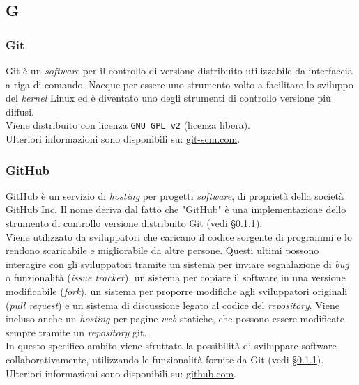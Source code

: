 \subsection{G}

\subsubsection{Git}
\label{git}
Git è un \textit{software} per il controllo di versione distribuito utilizzabile
da interfaccia a riga di comando.
Nacque per essere uno strumento volto a facilitare lo sviluppo del
\textit{kernel} Linux ed è diventato uno degli strumenti di controllo versione
più diffusi.\\
Viene distribuito con licenza \texttt{GNU GPL v2} (licenza libera). \\
Ulteriori informazioni sono disponibili su:
\href{https://git-scm.com/}{git-scm.com}.

\subsubsection{GitHub}
\label{github}
GitHub è un servizio di \textit{hosting} per progetti \textit{software}, di
proprietà della società GitHub Inc.
Il nome deriva dal fatto che "GitHub" è una implementazione dello strumento di
controllo versione distribuito Git (vedi \S\ref{git}). \\
Viene utilizzato da sviluppatori che caricano il codice sorgente di programmi e
lo rendono scaricabile e migliorabile da altre persone.
Questi ultimi possono interagire con gli sviluppatori tramite un sistema per
inviare segnalazione di \textit{bug} o funzionalità (\textit{issue tracker}), un sistema
per copiare il software in una versione modificabile (\textit{fork}), un sistema
per proporre modifiche agli sviluppatori originali (\textit{pull request}) e un
sistema di discussione legato al codice del \textit{repository}.
Viene incluso anche un \textit{hosting} per pagine \textit{web} statiche, che
possono essere modificate sempre tramite un \textit{repository} git.\\
In questo specifico ambito viene sfruttata la possibilità di sviluppare software
collaborativamente, utilizzando le funzionalità fornite da
Git (vedi \S\ref{git}). \\
Ulteriori informazioni sono disponibili su:
\href{https://github.com/}{github.com}.

\newpage
